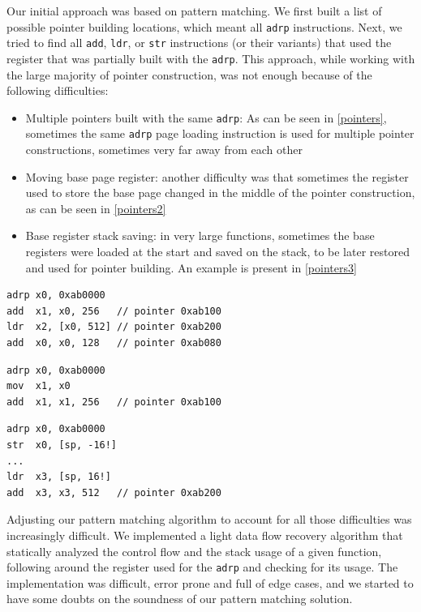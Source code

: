 \documentclass[a4paper,11pt,oneside]{report}
\begin{document}
Our initial approach was based on pattern matching. We first built a list of 
possible pointer building locations, which meant all \texttt{adrp} 
instructions. Next, we tried to find all \texttt{add}, \texttt{ldr}, or 
\texttt{str} instructions (or their variants) that used the register that was 
partially built with the \texttt{adrp}.  This approach, while working with the 
large majority of pointer construction, was not enough because of the following 
difficulties:
\begin{itemize}
	\item Multiple pointers built with the same \texttt{adrp}: As can be seen 
		in \autoref{pointers}, sometimes the same \texttt{adrp} page loading 
		instruction is used for multiple pointer constructions, sometimes very 
		far away from each other
	\item Moving base page register: another difficulty was that sometimes the 
		register used to store the base page changed in the middle of the 
		pointer construction, as can be seen in \autoref{pointers2}
	\item Base register stack saving: in very large functions, sometimes the 
		base registers were loaded at the start and saved on the stack, to be 
		later restored and used for pointer building. An example is present in 
		\autoref{pointers3}
\end{itemize}

\begin{lstlisting}[float,floatplacement=H,label=pointers,caption={Example of multiple pointers built from the same \texttt{adrp} instruction}]
adrp x0, 0xab0000
add  x1, x0, 256   // pointer 0xab100
ldr  x2, [x0, 512] // pointer 0xab200
add  x0, x0, 128   // pointer 0xab080
\end{lstlisting}
\begin{lstlisting}[float,floatplacement=H,label=pointers2,caption={Example of changing register during
pointer construction}]
adrp x0, 0xab0000
mov  x1, x0
add  x1, x1, 256   // pointer 0xab100
\end{lstlisting}
\begin{lstlisting}[float,floatplacement=H,label=pointers3,caption={Example of base page register stack
saving}]
adrp x0, 0xab0000
str  x0, [sp, -16!]
...
ldr  x3, [sp, 16!]
add  x3, x3, 512   // pointer 0xab200
\end{lstlisting}

Adjusting our pattern matching algorithm to account for all those difficulties
was increasingly difficult. We implemented a light data flow recovery algorithm
that statically analyzed the control flow and the stack usage of a given
function, following around the register used for the \texttt{adrp} and checking
for its usage.  The implementation was difficult, error prone and full of edge
cases, and we started to have some doubts on the soundness of our pattern
matching solution. 
\end{document}
